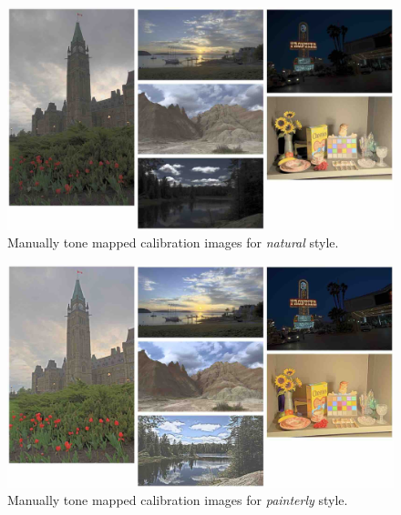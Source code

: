 \begin{figure}
\begin{center}
\includegraphics[width=\textwidth]{appendix2/calibimg_natural_small.jpg}
\caption{Manually tone mapped calibration images for \emph{natural} style.}
\end{center}
\end{figure}

\begin{figure}
\begin{center}
\includegraphics[width=\textwidth]{appendix2/calibimg_painterly_small.jpg}
\caption{Manually tone mapped calibration images for \emph{painterly} style.}
\end{center}
\end{figure}